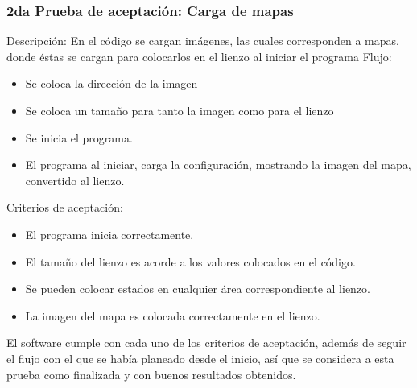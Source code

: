     \subsubsection{2da Prueba de aceptaci\'on: Carga de mapas}
        Descripci\'on: En el c\'odigo se cargan im\'agenes, las cuales
            corresponden a mapas, donde \'estas se cargan para colocarlos
            en el lienzo al iniciar el programa
        \vskip 0.5cm
        Flujo:
        \begin{itemize}
            \item Se coloca la direcci\'on de la imagen
            \item Se coloca un tama\~no para tanto la imagen como para el
            lienzo
            \item Se inicia el programa.
            \item El programa al iniciar, carga la configuraci\'on,
            mostrando la imagen del mapa, convertido al lienzo.
        \end{itemize}
        \vskip 0.5cm
        Criterios de aceptaci\'on:
        \begin{itemize}
            \item El programa inicia correctamente.
            \item El tama\~no del lienzo es acorde a los valores colocados
            en el c\'odigo.
            \item Se pueden colocar estados en cualquier \'area
            correspondiente al lienzo.
            \item La imagen del mapa es colocada correctamente en el
            lienzo.
        \end{itemize}
        \vskip 0.5cm
        El software cumple con cada uno de los criterios de
            aceptaci\'on, adem\'as de seguir el flujo con el que se hab\'ia
            planeado desde el inicio, as\'i que se considera a esta prueba
            como finalizada y con buenos resultados obtenidos.
    \vskip 0.5cm
